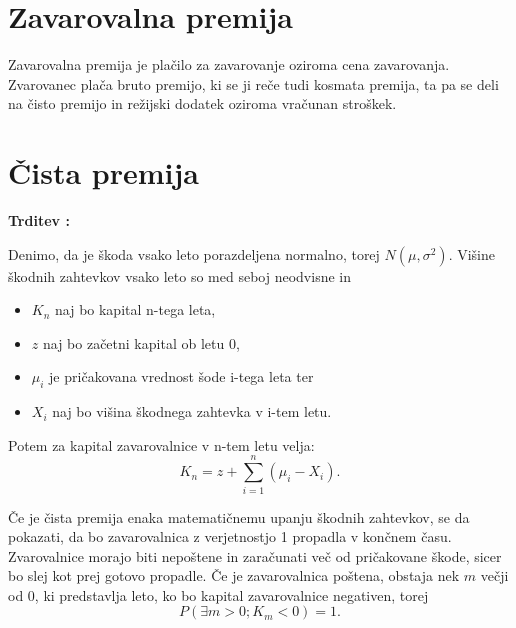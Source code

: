\documentclass[a4paper,12pt]{homework}
\newcounter{trditev}
\newenvironment{trditev}
{
	\stepcounter{trditev}
	\begin{flushleft}
		\textbf{Trditev \arabic{trditev}: }
	}
	{
	\end{flushleft}
}
\begin{document}
	\newpage
	\section{Zavarovalna premija}
	Zavarovalna premija je plačilo za zavarovanje oziroma cena zavarovanja. Zvarovanec plača bruto premijo, ki se ji reče tudi kosmata premija, ta pa se deli na čisto premijo in režijski dodatek oziroma vračunan stroškek. 
	
	\section{Čista premija}
	\begin{trditev} 
		Denimo, da je škoda vsako leto porazdeljena normalno, torej $N(\mu, \sigma ^2)$. Višine škodnih zahtevkov vsako leto so med seboj neodvisne in 
		\begin{itemize}
			\item $K_n$ naj bo kapital n-tega leta,
			\item $z$ naj bo začetni kapital ob letu $0$,
			\item $\mu_i$ je pričakovana vrednost šode i-tega leta ter
			\item $X_i$ naj bo višina škodnega zahtevka v i-tem letu.
		\end{itemize}
		Potem za kapital zavarovalnice v n-tem letu velja:
		\[
		K_n = z + \sum_{i=1}^n (\mu_i - X_i).
		\]
	\end{trditev}
	Če je čista premija enaka matematičnemu upanju škodnih zahtevkov, se da pokazati, da bo zavarovalnica z verjetnostjo 1 propadla v končnem času. Zvarovalnice morajo biti nepoštene in zaračunati več od pričakovane škode, sicer bo slej kot prej gotovo propadle. Če je zavarovalnica poštena, obstaja nek $m$ večji od 0, ki predstavlja leto, ko bo kapital zavarovalnice negativen, torej
	\[
	P(\exists m > 0; K_m < 0)=1.
	\]
	
\end{document}
